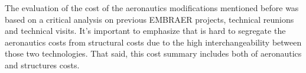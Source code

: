 The evaluation of the cost of the aeronautics modifications mentioned before was based on a critical analysis on previous EMBRAER projects, technical reunions and technical visits.
It's important to emphasize that is hard to segregate the aeronautics costs from structural costs due to the high interchangeability between those two technologies. That said, this cost summary includes both of aeronautics and structures costs.

\begin{figure}[H] %
\label{fig:AeroCostSum1}
\end{figure}

\begin{figure}[H] %
\label{fig:AeroCostSum2}
\end{figure}
